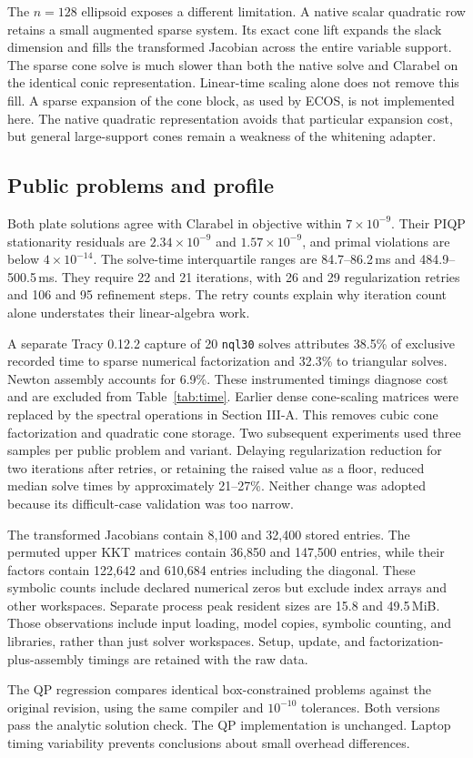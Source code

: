The $n=128$ ellipsoid exposes a different limitation. A native scalar quadratic row retains a small augmented sparse system. Its exact cone lift expands the slack dimension and fills the transformed Jacobian across the entire variable support. The sparse cone solve is much slower than both the native solve and Clarabel on the identical conic representation. Linear-time scaling alone does not remove this fill. A sparse expansion of the cone block, as used by ECOS, is not implemented here. The native quadratic representation avoids that particular expansion cost, but general large-support cones remain a weakness of the whitening adapter.

\subsection{Public problems and profile}
Both plate solutions agree with Clarabel in objective within $7\times10^{-9}$. Their PIQP stationarity residuals are $2.34\times10^{-9}$ and $1.57\times10^{-9}$, and primal violations are below $4\times10^{-14}$. The solve-time interquartile ranges are 84.7--86.2\,ms and 484.9--500.5\,ms. They require 22 and 21 iterations, with 26 and 29 regularization retries and 106 and 95 refinement steps. The retry counts explain why iteration count alone understates their linear-algebra work.

A separate Tracy 0.12.2 capture of 20 \texttt{nql30} solves attributes 38.5\% of exclusive recorded time to sparse numerical factorization and 32.3\% to triangular solves. Newton assembly accounts for 6.9\%. These instrumented timings diagnose cost and are excluded from Table~\ref{tab:time}. Earlier dense cone-scaling matrices were replaced by the spectral operations in Section III-A. This removes cubic cone factorization and quadratic cone storage. Two subsequent experiments used three samples per public problem and variant. Delaying regularization reduction for two iterations after retries, or retaining the raised value as a floor, reduced median solve times by approximately 21--27\%. Neither change was adopted because its difficult-case validation was too narrow.

The transformed Jacobians contain 8,100 and 32,400 stored entries. The permuted upper KKT matrices contain 36,850 and 147,500 entries, while their factors contain 122,642 and 610,684 entries including the diagonal. These symbolic counts include declared numerical zeros but exclude index arrays and other workspaces. Separate process peak resident sizes are 15.8 and 49.5\,MiB. Those observations include input loading, model copies, symbolic counting, and libraries, rather than just solver workspaces. Setup, update, and factorization-plus-assembly timings are retained with the raw data.

The QP regression compares identical box-constrained problems against the original revision, using the same compiler and $10^{-10}$ tolerances. Both versions pass the analytic solution check. The QP implementation is unchanged. Laptop timing variability prevents conclusions about small overhead differences.
